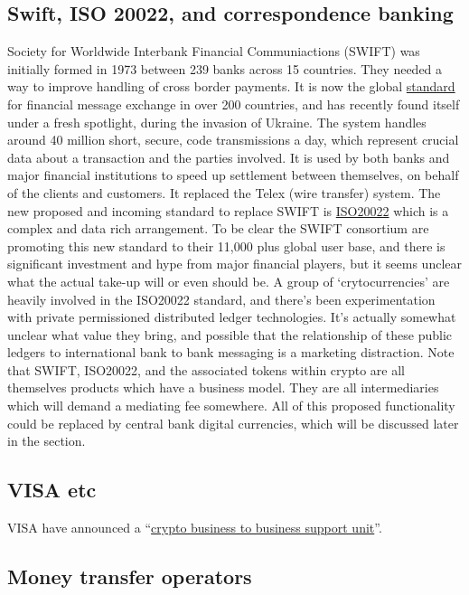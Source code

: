 \subsection{Swift, ISO 20022, and correspondence banking}
Society for Worldwide Interbank Financial Communiactions (SWIFT) was initially formed in 1973 between 239 banks across 15 countries. They needed a way to improve handling of cross border payments. It is now the global \href{https://www.swift.com/standards}{standard} for financial message exchange in over 200 countries, and has recently found itself under a fresh spotlight, during the invasion of Ukraine. The system handles around 40 million short, secure, code transmissions a day, which represent crucial data about a transaction and the parties involved. It is used by both banks and major financial institutions to speed up settlement between themselves, on behalf of the clients and customers. It replaced the Telex (wire transfer) system. The new proposed and incoming standard to replace SWIFT is \href{https://www.swift.com/standards/iso-20022}{ISO20022} which is a complex and data rich arrangement. To be clear the SWIFT consortium are promoting this new standard to their 11,000 plus global user base, and there is significant investment and hype from major financial players, but it seems unclear what the actual take-up will or even should be. A group of `crytocurrencies' are heavily involved in the ISO20022 standard, and there's been experimentation with private permissioned distributed ledger technologies. It's actually somewhat unclear what value they bring, and possible that the relationship of these public ledgers to international bank to bank messaging is a marketing distraction. Note that SWIFT, ISO20022, and the associated tokens within crypto are all themselves products which have a business model. They are all intermediaries which will demand a mediating fee somewhere. All of this proposed functionality could be replaced by central bank digital currencies, which will be discussed later in the section.
\subsection{VISA etc}
VISA have announced a ``\href{https://investor.visa.com/news/news-details/2021/Visa-Introduces-Crypto-Advisory-Services-to-Help-Partners-Navigate-a-New-Era-of-Money-Movement/default.aspx}{crypto business to business support unit}''. 
\subsection{Money transfer operators}

